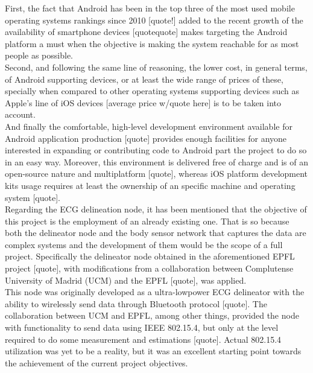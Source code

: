 		First, the fact that Android has been in the top three of the most used mobile operating systems rankings since 2010 [quote!] added to the recent growth of the availability of smartphone devices [quotequote] makes targeting the Android platform a must when the objective is making the system reachable for as most people as possible.\\

		Second, and following the same line of reasoning, the lower cost, in general terms, of Android supporting devices, or at least the wide range of prices of these, specially when compared to other operating systems supporting devices such as Apple's line of iOS devices [average price w/quote here] is to be taken into account.\\

		And finally the comfortable, high-level development environment available for Android application production [quote] provides enough facilities for anyone interested in expanding or contributing code to Android part the project to do so in an easy way. Moreover, this environment is delivered free of charge and is of an open-source nature and multiplatform [quote], whereas iOS platform development kits usage requires at least the ownership of an specific machine and operating system [quote].\\

		Regarding the ECG delineation node, it has been mentioned that the objective of this project is the employment of an already existing one. That is so because both the delineator node and the body sensor network that captures the data are complex systems and the development of them would be the scope of a full project. Specifically the delineator node obtained in the aforementioned EPFL project [quote], with modifications from a collaboration between Complutense University of Madrid (UCM) and the EPFL [quote], was applied.\\

		This node was originally developed as a ultra-lowpower ECG delineator with the ability to wirelessly send data through Bluetooth protocol [quote]. The collaboration between UCM and EPFL, among other things, provided the node with functionality to send data using IEEE 802.15.4, but only at the level required to do some measurement and estimations [quote]. Actual 802.15.4 utilization was yet to be a reality, but it was an excellent starting point towards the achievement of the current project objectives.\\


